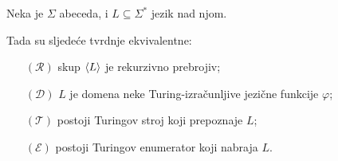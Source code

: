\begin{teorem}[{name=[teorem ekvivalencije za poluodlučive jezike]}]
Neka je $\Sigma$ abeceda, i $L\subseteq\Sigma^*$ jezik nad njom.

Tada su sljedeće tvrdnje ekvivalentne:
\begin{enumerate}
    \item[$(\mathcal R)$] skup $\langle L\rangle$ je rekurzivno prebrojiv;
    \item[$(\mathcal D)$] $L$ je domena neke Turing-izračunljive jezične funkcije $\varphi$;
    \item[$(\mathcal T)$] postoji Turingov stroj koji prepoznaje $L$;
    \item[$(\mathcal E)$] postoji Turingov enumerator koji nabraja $L$.
\end{enumerate}
\end{teorem}
